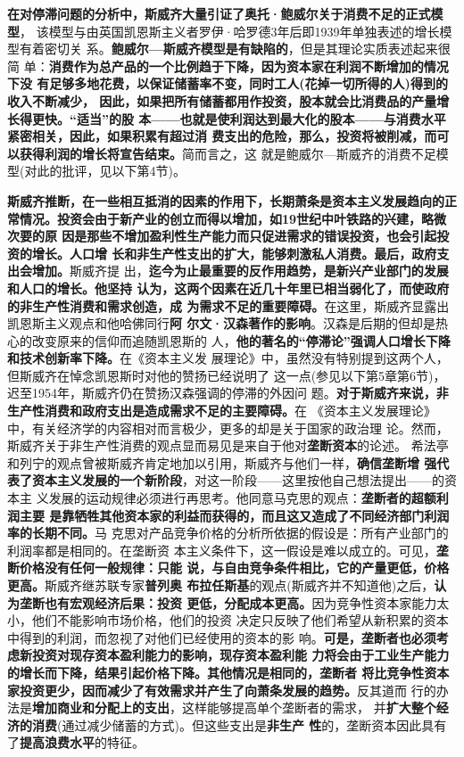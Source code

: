 \textbf{在对停滞问题的分析中，斯威齐大量引证了奥托·鲍威尔关于消费不足的正式模型}，
该模型与由英国凯恩斯主义者罗伊·哈罗德3年后即1939年单独表述的增长模型有着密切关
系。\textbf{鲍威尔—斯威齐模型是有缺陷的}，但是其理论实质表述起来很简
单：\textbf{消费作为总产品的一个比例趋于下降，因为资本家在利润不断增加的情况下没
  有足够多地花费，以保证储蓄率不变，同时工人(花掉一切所得的人)得到的收入不断减少，
  因此，如果把所有储蓄都用作投资，股本就会比消费品的产量增长得更快。“适当”的股
  本——也就是使利润达到最大化的股本——与消费水平紧密相关，因此，如果积累有超过消
  费支出的危险，那么，投资将被削减，而可以获得利润的增长将宣告结束。}简而言之，这
就是鲍威尔—斯威齐的消费不足模型(对此的批评，见以下第4节)。

\textbf{斯威齐推断，在一些相互抵消的因素的作用下，长期萧条是资本主义发展趋向的正
  常情况。投资会由于新产业的创立而得以增加，如19世纪中叶铁路的兴建，略微次要的原
  因是那些不增加盈利性生产能力而只促进需求的错误投资，也会引起投资的增长。人口增
  长和非生产性支出的扩大，能够刺激私人消费。最后，政府支出会增加。}斯威齐提
出，\textbf{迄今为止最重要的反作用趋势，是新兴产业部门的发展和人口的增长。他坚持
  认为，这两个因素在近几十年里已相当弱化了，而使政府的非生产性消费和需求创造，成
  为需求不足的重要障碍。}在这里，斯威齐显露出凯恩斯主义观点和他哈佛同行\textbf{阿
  尔文·汉森著作的影响}。汉森是后期的但却是热心的改变原来的信仰而追随凯恩斯的
人，\textbf{他的著名的“停滞论”强调人口增长下降和技术创新率下降。}在《资本主义发
展理论》中，虽然没有特别提到这两个人，但斯威齐在悼念凯恩斯时对他的赞扬已经说明了
这一点(参见以下第5章第6节)，迟至1954年，斯威齐仍在赞扬汉森强调的停滞的外因问
题。\textbf{对于斯威齐来说，非生产性消费和政府支出是造成需求不足的主要障碍。}在
《资本主义发展理论》中，有关经济学的内容相对而言极少，更多的却是关于国家的政治理
论。然而，斯威齐关于非生产性消费的观点显而易见是来自于他对\textbf{垄断资本}的论述。
希法亭和列宁的观点曾被斯威齐肯定地加以引用，斯威齐与他们一样，\textbf{确信垄断增
  强代表了资本主义发展的一个新阶段}，对这一阶段——这里按他自己想法提出——的资本主
义发展的运动规律必须进行再思考。他同意马克思的观点：\textbf{垄断者的超额利润主要
  是靠牺牲其他资本家的利益而获得的，而且这又造成了不同经济部门利润率的长期不同。}马
克思对产品竞争价格的分析所依据的假设是：所有产业部门的利润率都是相同的。在垄断资
本主义条件下，这一假设是难以成立的。可见，\textbf{垄断价格没有任何一般规律：只能
  说，与自由竞争条件相比，它的产量更低，价格更高。}斯威齐继苏联专家\textbf{普列奥
  布拉任斯基}的观点(斯威齐并不知道他)之后，\textbf{认为垄断也有宏观经济后果：投资
  更低，分配成本更高。}因为竞争性资本家能力太小，他们不能影响市场价格，他们的投资
决定只反映了他们希望从新积累的资本中得到的利润，而忽视了对他们已经使用的资本的影
响。\textbf{可是，垄断者也必须考虑新投资对现存资本盈利能力的影响，现存资本盈利能
  力将会由于工业生产能力的增长而下降，结果引起价格下降。其他情况是相同的，垄断者
  将比竞争性资本家投资更少，因而减少了有效需求并产生了向萧条发展的趋势。}反其道而
行的办法是\textbf{增加商业和分配上的支出}，这样能够提高单个垄断者的需求，
并\textbf{扩大整个经济的消费}(通过减少储蓄的方式)。但这些支出是\textbf{非生产
  性}的，垄断资本因此具有了\textbf{提高浪费水平}的特征。

